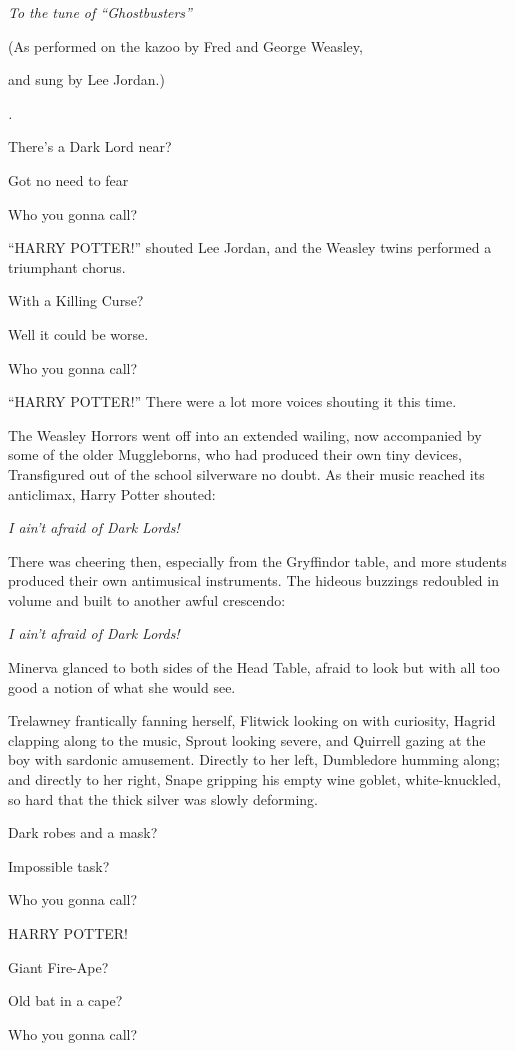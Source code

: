 \emph{To the tune of ``Ghostbusters''}

(As performed on the kazoo by Fred and George Weasley,

and sung by Lee Jordan.)

\emph{.}

There's a Dark Lord near?

Got no need to fear

Who you gonna call?

``HARRY POTTER!'' shouted Lee Jordan, and the Weasley twins performed a
triumphant chorus.

With a Killing Curse?

Well it could be worse.

Who you gonna call?

``HARRY POTTER!'' There were a lot more voices shouting it this time.

The Weasley Horrors went off into an extended wailing, now accompanied
by some of the older Muggleborns, who had produced their own tiny
devices, Transfigured out of the school silverware no doubt. As their
music reached its anticlimax, Harry Potter shouted:

\emph{I ain't afraid of Dark Lords!}

There was cheering then, especially from the Gryffindor table, and more
students produced their own antimusical instruments. The hideous
buzzings redoubled in volume and built to another awful crescendo:

\emph{I ain't afraid of Dark Lords!}

Minerva glanced to both sides of the Head Table, afraid to look but with
all too good a notion of what she would see.

Trelawney frantically fanning herself, Flitwick looking on with
curiosity, Hagrid clapping along to the music, Sprout looking severe,
and Quirrell gazing at the boy with sardonic amusement. Directly to her
left, Dumbledore humming along; and directly to her right, Snape
gripping his empty wine goblet, white-knuckled, so hard that the thick
silver was slowly deforming.

Dark robes and a mask?

Impossible task?

Who you gonna call?

HARRY POTTER!

Giant Fire-Ape?

Old bat in a cape?

Who you gonna call?

